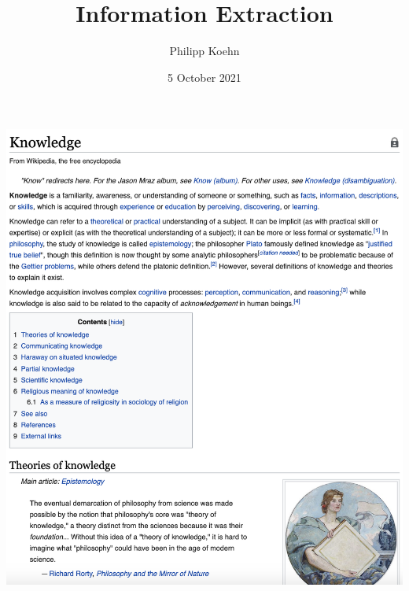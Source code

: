 \documentclass[landscape]{jhuslides3C}
\begin{document}
\rm
\title[Introduction to Human Language Technology: Information Extraction]{Information Extraction}
\author[Philipp Koehn]{Philipp Koehn}
\date{5 October 2021}
\maketitle


\vfill
\includegraphics[scale=0.35]{wikipedia-knowledge.png}
\end{document}
